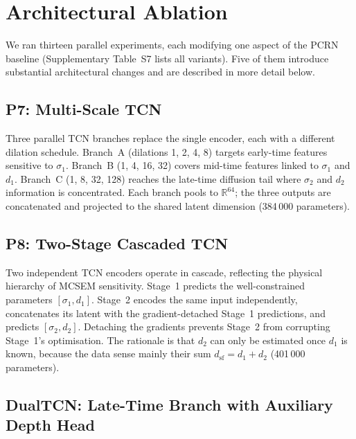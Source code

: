 \documentclass[journal]{IEEEtran}
\begin{document}
\section{Architectural Ablation}
\label{sec:ablation}

We ran thirteen parallel experiments, each modifying one aspect of
the PCRN baseline (Supplementary Table~S7 lists all variants).
Five of them introduce substantial architectural changes and are
described in more detail below.


\subsection{P7: Multi-Scale TCN}

Three parallel TCN branches replace the single encoder, each with a
different dilation schedule. Branch~A (dilations 1, 2, 4, 8) targets
early-time features sensitive to $\sigma_1$. Branch~B (1, 4, 16, 32)
covers mid-time features linked to $\sigma_1$ and $d_1$. Branch~C
(1, 8, 32, 128) reaches the late-time diffusion tail where
$\sigma_2$ and $d_2$ information is concentrated. Each branch pools
to $\mathbb{R}^{64}$; the three outputs are concatenated and
projected to the shared latent dimension (384\,000 parameters).

\subsection{P8: Two-Stage Cascaded TCN}

Two independent TCN encoders operate in cascade, reflecting the
physical hierarchy of MCSEM sensitivity. Stage~1 predicts the
well-constrained parameters $[\sigma_1, d_1]$. Stage~2 encodes the
same input independently, concatenates its latent with the
gradient-detached Stage~1 predictions, and predicts
$[\sigma_2, d_2]$. Detaching the gradients prevents Stage~2 from
corrupting Stage~1's optimisation. The rationale is that $d_2$ can
only be estimated once $d_1$ is known, because the data sense mainly
their sum $d_\mathrm{sf} = d_1 + d_2$ (401\,000 parameters).

\subsection{DualTCN: Late-Time Branch with Auxiliary Depth Head}
\label{sec:dualtcn}
\end{document}
